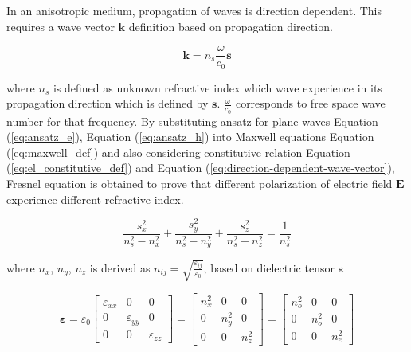 \documentclass[thesis]{deutez}
\begin{document}
    In an anisotropic medium, propagation of waves is direction dependent. This requires a wave vector $\mathbf{k}$ definition based on propagation direction. 
    
    \begin{equation}
        \mathbf{k} = n_s \frac{\omega}{c_0} \mathbf{s}
        \label{eq:direction-dependent-wave-vector}
    \end{equation}  
    
    where $n_s$ is defined as unknown refractive index which wave experience in its propagation direction which is defined by $\mathbf{s}$. $\frac{\omega}{c_0}$ corresponds to free space wave number for that frequency. By substituting ansatz for plane waves Equation (\ref{eq:ansatz_e}), Equation (\ref{eq:ansatz_h}) into Maxwell equations Equation (\ref{eq:maxwell_def}) and also considering constitutive relation Equation (\ref{eq:el_constitutive_def}) and Equation (\ref{eq:direction-dependent-wave-vector}), Fresnel equation is obtained to prove that different polarization of electric field $\mathbf{E}$ experience different refractive index.

    \begin{equation}
        \frac{s_x^2}{n_s^2 - n_x^2} + \frac{s_y^2}{n_s^2 - n_y^2} + \frac{s_z^2}{n_s^2 - n_z^2} = \frac{1}{n_s^2}
        \label{eq:fresnel-eq}
    \end{equation} 

    where $n_x$, $n_y$, $n_z$ is derived as $n_{ij}=\sqrt{\frac{\varepsilon_{ij}}{\varepsilon_0}}$, based on dielectric tensor $\bm\varepsilon$

    \begin{equation}
        \bm\varepsilon=\varepsilon_0
        \begin{bmatrix}
            \varepsilon_{xx} & 0 & 0\\
            0 & \varepsilon_{yy} & 0\\
            0 & 0 & \varepsilon_{zz}
        \end{bmatrix}
        =
        \begin{bmatrix}
            n^2_{x} & 0 & 0\\
            0 & n^2_{y} & 0\\
            0 & 0 & n^2_{z} 
        \end{bmatrix}
        =
        \begin{bmatrix}
            n^2_{o} & 0 & 0\\
            0 & n^2_{o} & 0\\
            0 & 0 & n^2_{e} 
        \end{bmatrix}
        \label{eq:dielectric-tensor}
    \end{equation}
    
\end{document}

